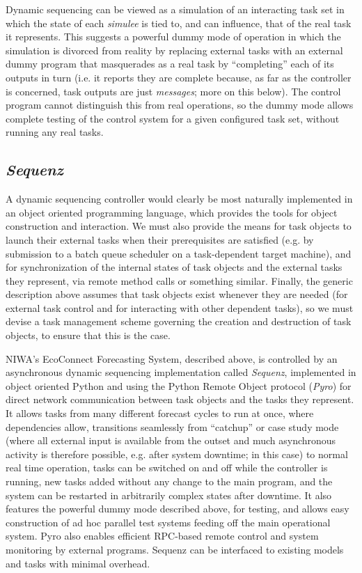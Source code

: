 \documentclass[11pt,a4paper]{article}
\begin{document}
Dynamic sequencing can be viewed as a simulation of an interacting task
set in which the state of each {\em simulee} is tied to, and can
influence, that of the real task it represents.  This suggests a
powerful dummy mode of operation in which the simulation is divorced
from reality by replacing external tasks with an external dummy program
that masquerades as a real task by ``completing'' each of its outputs in
turn (i.e. it reports they are complete because, as far as the
controller is concerned, task outputs are just {\em messages}; more on
this below).  The control program cannot distinguish this from real
operations, so the dummy mode allows complete testing of the control
system for a given configured task set, without running any real tasks.


\subsection{{\em Sequenz}}

A dynamic sequencing controller would clearly be most naturally
implemented in an object oriented programming language, which provides
the tools for object construction and interaction.  We must also provide
the means for task objects to launch their external tasks when their
prerequisites are satisfied (e.g.  by submission to a batch queue
scheduler on a task-dependent target machine), and for synchronization
of the internal states of task objects and the external tasks they
represent, via remote method calls or something similar.  Finally, the
generic description above assumes that task objects exist whenever they
are needed (for external task control and for interacting with other
dependent tasks), so we must devise a task management scheme governing
the creation and destruction of task objects, to ensure that this is the
case.

NIWA's EcoConnect Forecasting System, described above, is controlled by
an asynchronous dynamic sequencing implementation called {\em Sequenz},
implemented in object oriented Python and using the Python Remote Object
protocol ({\em Pyro}) for direct network communication between task
objects and the tasks they represent. It allows tasks from many
different forecast cycles to run at once, where dependencies allow,
transitions seamlessly from ``catchup'' or case study mode (where all
external input is available from the outset and much asynchronous
activity is therefore possible, e.g. after system downtime; in this
case) to normal real time operation, tasks can be switched on and off
while the controller is running, new tasks added without any change to
the main program, and the system can be restarted in arbitrarily complex
states after downtime.  It also features the powerful dummy mode
described above, for testing, and allows easy construction of ad hoc
parallel test systems feeding off the main operational system. Pyro also
enables efficient RPC-based remote control and system monitoring by
external programs.  Sequenz can be interfaced to existing models and
tasks with minimal overhead. 
\end{document}

